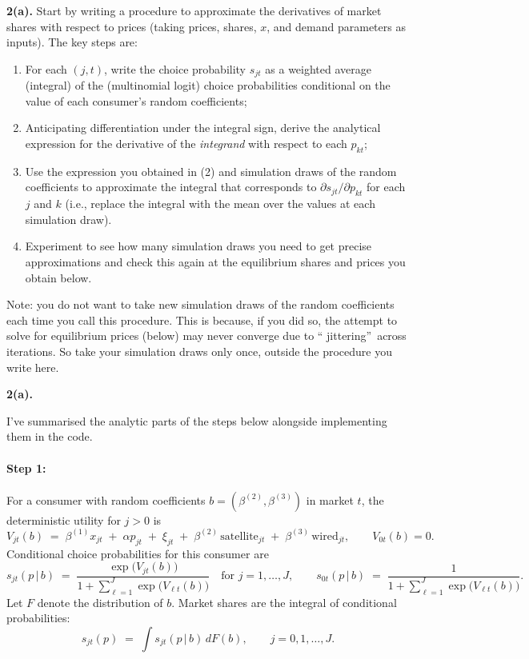 \documentclass{article}
\begin{document}
\begin{tcolorbox}
\textbf{2(a).} Start by writing a procedure to approximate the derivatives of market
shares with respect to prices (taking prices, shares, $x$, and demand
parameters as inputs). The key steps are:
\begin{enumerate}
\item For each $(j,t)$, write the choice probability $s_{jt}$ as a weighted
average (integral) of the (multinomial logit) choice probabilities
conditional on the value of each consumer's random coefficients;
\item Anticipating differentiation under the integral sign, derive the
analytical expression for the derivative of the \textit{integrand} with
respect to each $p_{kt}$; 
\item Use the expression you obtained in (2) and simulation draws of the
random coefficients to approximate the integral that corresponds to $%
\partial s_{jt}/\partial p_{kt}$ for each $j$ and $k$ (i.e., replace
the integral with the mean over the values at each simulation draw).
\item Experiment to see how many simulation draws you need to get precise
approximations and check this again at the equilibrium shares and prices you
obtain below. \newline
\end{enumerate}
Note: you do not want to take new simulation draws of the random
coefficients each time you call this procedure. This is because,  if you did so, the attempt
to solve for equilibrium prices (below) may never converge due to \textquotedblleft
jittering\textquotedblright\ across iterations. So take your simulation draws only once, outside the procedure you write here. 
\end{tcolorbox}
\textbf{2(a).}

I've summarised the analytic parts of the steps below alongside implementing them in the code.

\paragraph{Step 1:}

For a consumer with random coefficients $b=(\beta^{(2)},\beta^{(3)})$ in market $t$, the deterministic utility for $j>0$ is
\[
V_{jt}(b) \;=\; \beta^{(1)} x_{jt} \;+\; \alpha p_{jt} \;+\; \xi_{jt}
\;+\; \beta^{(2)} \,\text{satellite}_{jt} \;+\; \beta^{(3)} \,\text{wired}_{jt},
\qquad V_{0t}(b) = 0.
\]
Conditional choice probabilities for this consumer are
\[
s_{jt}(p\,|\,b) \;=\; \frac{\exp\!\big(V_{jt}(b)\big)}{1 + \sum_{\ell=1}^J \exp\!\big(V_{\ell t}(b)\big)}
\quad\text{for } j=1,\dots,J,
\qquad
s_{0t}(p\,|\,b) \;=\; \frac{1}{1 + \sum_{\ell=1}^J \exp\!\big(V_{\ell t}(b)\big)}.
\]
Let $F$ denote the distribution of $b$. Market shares are the integral of conditional probabilities:
\[
s_{jt}(p) \;=\; \int s_{jt}(p\,|\,b)\, dF(b), \qquad j=0,1,\dots,J.
\]
\end{document}

